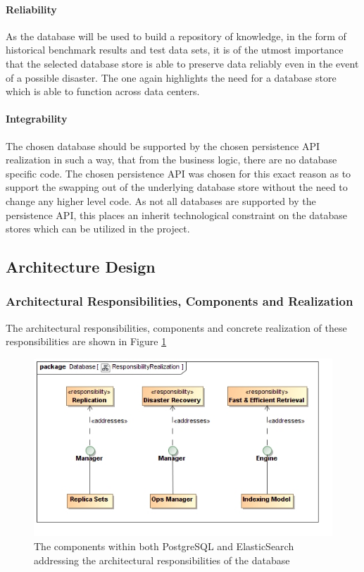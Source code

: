 \paragraph*{Reliability}
As the database will be used to build a repository of knowledge, in the form of
historical benchmark results and test data sets, it is of the utmost importance
that the selected database store is able to preserve data reliably even in the
event of a possible disaster. The one again highlights the need for a database
store which is able to function across data centers.

\paragraph*{Integrability}
The chosen database should be supported by the chosen persistence API realization
in such a way, that from the business logic, there are no database specific
code. The chosen persistence API was chosen for this exact reason as to support
the swapping out of the underlying database store without the need to change any
higher level code. As not all databases are supported by the persistence API,
this places an inherit technological constraint on the database stores which can
be utilized in the project.

\subsection{Architecture Design}

\subsubsection{Architectural Responsibilities, Components and Realization}
The architectural responsibilities, components and concrete realization of these 
responsibilities are shown in 
Figure \ref{fig:databaseResponsibilityRealization}
\begin{figure}[H]
	\begin{center}
	\includegraphics[scale=0.5]{../Diagrams and Charts/Database/ResponsibilityRealization.jpg}
	\caption{The components within both PostgreSQL and ElasticSearch addressing the architectural responsibilities of the database}
	\label{fig:databaseResponsibilityRealization}
	\end{center}
\end{figure}

